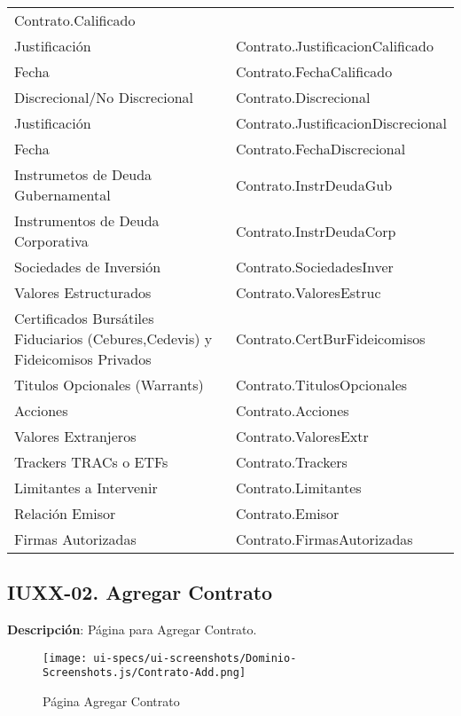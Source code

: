 \begin{table}[H]
\begin{tabular}{ p{4cm} p{8cm} }
		Contrato.Calificado \\
		Justificaci\'on &
		Contrato.JustificacionCalificado \\
		Fecha &
		Contrato.FechaCalificado \\
		Discrecional/No Discrecional &
		Contrato.Discrecional \\
		Justificaci\'on &
		Contrato.JustificacionDiscrecional \\
		Fecha &
		Contrato.FechaDiscrecional \\
		Instrumetos de Deuda Gubernamental &
		Contrato.InstrDeudaGub \\
		Instrumentos de Deuda Corporativa &
		Contrato.InstrDeudaCorp \\
		Sociedades de Inversi\'on &
		Contrato.SociedadesInver \\
		Valores Estructurados &
		Contrato.ValoresEstruc \\
		Certificados Burs\'atiles Fiduciarios (Cebures,Cedevis) y Fideicomisos Privados &
		Contrato.CertBurFideicomisos \\
		Titulos Opcionales (Warrants) &
		Contrato.TitulosOpcionales \\
		Acciones &
		Contrato.Acciones \\
		Valores Extranjeros &
		Contrato.ValoresExtr \\
		Trackers TRACs o ETFs &
		Contrato.Trackers \\
		Limitantes a Intervenir &
		Contrato.Limitantes \\
		Relaci\'on Emisor &
		Contrato.Emisor \\
		Firmas Autorizadas &
		Contrato.FirmasAutorizadas \\
		\hline
	\end{tabular}
\end{table}

\clearpage
\subsection{IUXX-02. Agregar Contrato} \label{sec:ui-page-create-contrato}

\textbf{Descripci\'on}: P\'agina para Agregar Contrato.\\

\begin{figure}[H]
	\label{tab:ui-create-contrato-page}
	\texttt{[image: ui-specs/ui-screenshots/Dominio-Screenshots.js/Contrato-Add.png]}
	\caption{P\'agina Agregar Contrato}
\end{figure}

